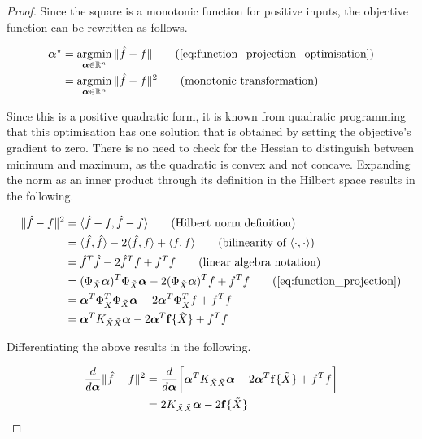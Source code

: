 \documentclass[twoside]{article} \usepackage{aistats2017}
\theoremstyle{definition}
\theoremstyle{theorem}
\newcommand{\argmin}{\operatornamewithlimits{argmin}}
\newcommand{\ds}[1]{\tilde{#1}}
\newcommand{\inner}[2]{{\langle #1, #2 \rangle}}
\begin{document}
		\begin{proof}
			Since the square is a monotonic function for positive inputs, the objective function can be rewritten as follows.
			
			\begin{align*}
				\bm{\alpha}^{\star} &= \argmin_{\bm{\alpha} \in \mathbb{R}^{n}} \Vert \hat{f} - f \Vert \tag{\cref{eq:function_projection_optimisation}} \\
				&= \argmin_{\bm{\alpha} \in \mathbb{R}^{n}} \Vert \hat{f} - f \Vert^{2} \tag{monotonic transformation}
			\end{align*}
			
			Since this is a positive quadratic form, it is known from quadratic programming that this optimisation has one solution that is obtained by setting the objective's gradient to zero. There is no need to check for the Hessian to distinguish between minimum and maximum, as the quadratic is convex and not concave. Expanding the norm as an inner product through its definition in the Hilbert space results in the following.
	
			\begin{align*}
				\Vert \hat{f} - f \Vert^{2} &= \langle \hat{f} - f, \hat{f} - f \rangle \tag{Hilbert norm definition} \\
				&= \langle \hat{f}, \hat{f} \rangle - 2 \langle \hat{f}, f \rangle + \langle f, f \rangle \tag{bilinearity of $\inner{\cdot}{\cdot}$} \\
				&=  \hat{f}^{T} \hat{f} - 2 \hat{f}^{T} f + f^{T} f \tag{linear algebra notation} \\
				&= (\Phi_{\ds{X}} \bm{\alpha})^{T} \Phi_{\ds{X}}  \bm{\alpha} - 2 (\Phi_{\ds{X}}  \bm{\alpha})^{T} f + f^{T} f \tag{\cref{eq:function_projection}}\\
				&= \bm{\alpha}^{T} \Phi_{\ds{X}} ^{T} \Phi_{\ds{X}}  \bm{\alpha} - 2 \bm{\alpha}^{T} \Phi_{\ds{X}} ^{T} f + f^{T} f \\
				&= \bm{\alpha}^{T} K_{\ds{X} \ds{X}}  \bm{\alpha} - 2 \bm{\alpha}^{T} \bvec{f}\{\ds{X}\} + f^{T} f \\
			\end{align*}
			
			Differentiating the above results in the following.
			
			\begin{align*}
				\frac{d}{d \bm{\alpha}} \Vert \hat{f} - f \Vert^{2} &= \frac{d}{d \bm{\alpha}} 
				\bigg[ \bm{\alpha}^{T} K_{\ds{X} \ds{X}}  \bm{\alpha} - 2 \bm{\alpha}^{T} \bvec{f}\{\ds{X}\} + f^{T} f \bigg]\\
				&= 2 K_{\ds{X} \ds{X}}  \bm{\alpha} - 2 \bvec{f}\{\ds{X}\}
			\end{align*}
			

\end{proof}
\end{document}
